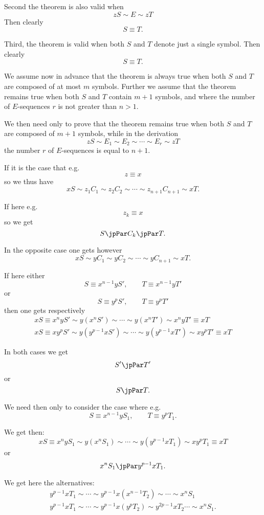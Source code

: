Second the theorem is also valid when
$$zS \sim E \sim zT$$
Then clearly
$$S \equiv T.$$

Third, the theorem is valid when both $S$ and $T$ denote just a single symbol.
Then clearly
$$S \equiv T.$$

We assume now 
in advance that the theorem is always true when both
$S$ and $T$ are composed of at most $m$ symbols.
Further we assume that the theorem remains true when both $S$ and $T$
contain $m+1$ symbols, and where the number of $E$-sequences $r$ is
not greater than $n > 1$.

We then need only to prove that the theorem remains true when both $S$ and $T$
are composed of $m+1$ symbols, while in the derivation
$$zS \sim E_1 \sim E_2 \sim \cdots \sim E_r \sim zT$$
the number $r$ of $E$-sequences is equal to $n+1$.

If it is the case that e.g.
$$z \equiv x$$
so we thus have
$$xS \sim z_1C_1 \sim z_2C_2 \sim \cdots \sim z_{n+1}C_{n+1} \sim
xT.$$

If here e.g.
$$z_k \equiv x$$
so we get
$$S \jpPar C_k \jpPar T.$$

In the opposite case one gets however
$$xS \sim yC_1 \sim yC_2 \sim \cdots \sim yC_{n+1} \sim xT.$$

If here either
$$S \equiv x^{n-1}yS', \qquad T \equiv x^{n-1}yT'$$
or
$$S \equiv y^pS', \qquad T \equiv y^pT'$$
then one gets respectively
\begin{gather*}
xS \equiv x^{n}yS' \sim y(x^nS') \sim \cdots \sim y(x^nT') \sim
x^{n}yT' \equiv xT\\
xS \equiv xy^{p}S' \sim y(y^{p-1}xS') \sim \cdots \sim y(y^{p-1}xT') \sim
xy^{p}T' \equiv xT
\end{gather*}

In both cases we get
$$S' \jpPar T'$$
or
$$S \jpPar T.$$


We need then only to consider the case where e.g.\
$$S \equiv x^{n-1}yS_1, \qquad T \equiv y^pT_1.$$

We get then:
$$xS \equiv x^{n}yS_1 \sim y(x^nS_1) \sim \cdots \sim y(y^{p-1}xT_1) \sim
xy^pT_1 \equiv xT$$
or
$$x^nS_1 \jpPar y^{p-1}xT_1.$$

We get here the alternatives:
\begin{gather*}
y^{p-1}xT_1 \sim \cdots \sim y^{p-1}x(x^{n-1}T_2) \sim \cdots \sim
x^nS_1\\
y^{p-1}xT_1 \sim \cdots \sim y^{p-1}x(y^{p}T_2) \sim y^{2p-1}xT_2 \cdots \sim
x^nS_1.
\end{gather*}

